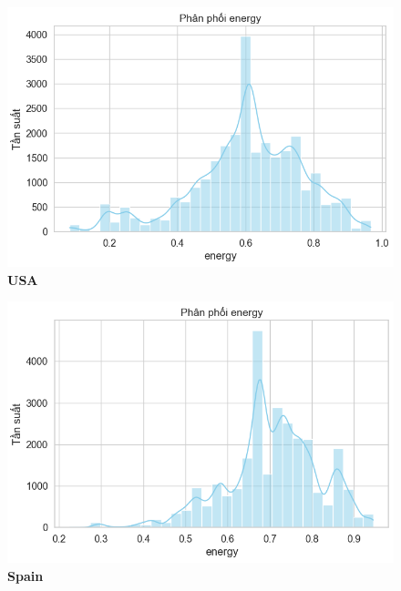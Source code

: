 \begin{itemize}
\begin{itemize}
   \begin{figure}[H]
        \centering
        \begin{minipage}{0.45\textwidth}
            \centering
            \includegraphics[width=\linewidth]{../graphics/data_top50/figure/3/EDA_USA.png}
            \\[4pt] {\small \textbf{USA}}
        \end{minipage}
        \hfill
        \begin{minipage}{0.45\textwidth}
            \centering
            \includegraphics[width=\linewidth]{../graphics/data_top50/figure/3/EDA_spain.png}
            \\[4pt] {\small \textbf{Spain}}
        \end{minipage}

        \vspace{0.4cm}


\end{figure}
\end{itemize}
\end{itemize}
